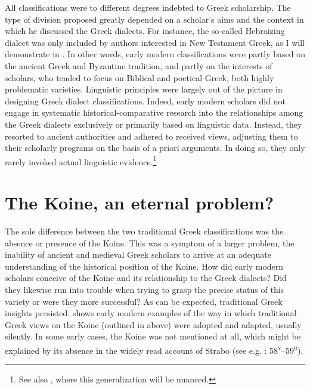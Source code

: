 {All classifications were to different degrees indebted to Greek scholarship. The type of division proposed greatly depended on a scholar’s aims and the context in which he discussed the Greek dialects. For instance, the so-called Hebraizing dialect was only included by authors interested in New Testament Greek, as I will demonstrate in . In other words, early modern classifications were partly based on the ancient Greek and Byzantine tradition, and partly on the interests of scholars, who tended to focus on Biblical and poetical Greek, both highly problematic varieties. Linguistic principles were largely out of the picture in designing Greek dialect classifications. Indeed, early modern scholars did not engage in systematic historical-comparative research into the relationships among the Greek dialects exclusively or primarily based on linguistic data. Instead, they resorted to ancient authorities and adhered to received views, adjusting them to their scholarly programs on the basis of a priori arguments. In doing so, they only rarely invoked actual linguistic evidence.\footnote{See also , where this generalization will be nuanced.}

\section{The Koine, an eternal problem?}\label{sec:2.9}

The sole difference between the two traditional Greek classifications was the absence or presence of the Koine. This was a symptom of a larger problem, the inability of ancient and medieval Greek scholars to arrive at an adequate understanding of the historical position of the Koine. How did early modern scholars conceive of the Koine and its relationship to the Greek dialects? Did they likewise run into trouble when trying to grasp the precise status of this variety or were they more successful? As can be expected, traditional Greek insights persisted.  shows early modern examples of the way in which traditional Greek views on the Koine (outlined in  above) were adopted and adapted, usually silently. In some early cases, the Koine was not mentioned at all, which might be explained by its absence in the widely read account of Strabo (see e.g. \citealt{Stapleton1566}: 58\textsc{\textsuperscript{v}}–59\textsc{\textsuperscript{r}}).

}
